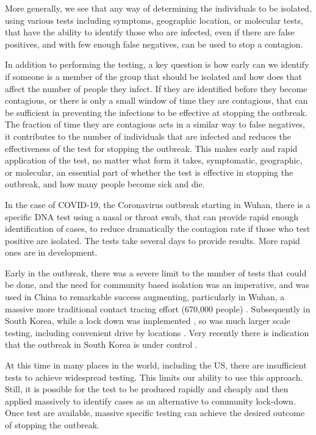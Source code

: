 \documentclass[onecolumn,journal]{IEEEtran}
\begin{document}
\begin{multicols}{2}
\begin{itemize}
\end{itemize}

More generally, we see that any way of determining the individuals to be isolated, using various tests including symptoms, geographic location, or molecular tests, that have the ability to identify those who are infected, even if there are false positives, and with few enough false negatives, can be used to stop a contagion.

In addition to performing the testing, a key question is how early can we identify if someone is a member of the group that should be isolated and how does that affect the number of people they infect. If they are identified before they become contagious, or there is only a small window of time they are contagious, that can be sufficient in preventing the infections to be effective at stopping the outbreak. The fraction of time they are contagious acts in a similar way to false negatives, it contributes to the number of individuals that are infected and reduces the effectiveness of the test for stopping the outbreak. This makes early and rapid application of the test, no matter what form it takes, symptomatic, geographic, or molecular, an essential part of whether the test is effective in stopping the outbreak, and how many people become sick and die. 

In the case of COVID-19, the Coronavirus outbreak starting in Wuhan, there is a specific DNA test using a nasal or throat swab, that can provide rapid enough identification of cases, to reduce dramatically the contagion rate if those who test positive are isolated. The tests take several days to provide results. More rapid ones are in development. 

Early in the outbreak, there was a severe limit to the number of tests that could be done, and the need for community based isolation was an imperative, and was used in China to remarkable success augmenting, particularly in Wuhan, a massive more traditional contact tracing effort (670,000 people) \cite{China}. Subsequently in South Korea, while a lock down was implemented  \cite{Daegu}, so was much larger scale testing, including convenient drive by locations \cite{SouthKorea}. Very recently there is indication that the outbreak in South Korea is under control \cite{successSK}.

At this time in many places in the world, including the US, there are insufficient tests to achieve widespread testing. This limits our ability to use this approach. Still, it is possible for the test to be produced rapidly and cheaply and then applied massively to identify cases as an alternative to community lock-down. Once test are available, massive specific testing can achieve the desired outcome of stopping the outbreak.


\end{multicols}
\end{document}
